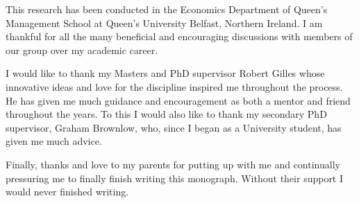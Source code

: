 \documentclass[11pt,fleqn]{book}
\begin{document}
This research has been conducted in the Economics Department of Queen's Management School at Queen's University Belfast, Northern Ireland. I am thankful for all the many beneficial and encouraging discussions with members of our group over my academic career. 

I would like to thank my Masters and PhD supervisor Robert Gilles whose innovative ideas and love for the discipline inspired me throughout the process. He has given me much guidance and encouragement as both a mentor and friend throughout the years. To this I would also like to thank my secondary PhD supervisor, Graham Brownlow, who, since I began as a University student, has given me much advice.

Finally, thanks and love to my parents for putting up with me and continually pressuring me to finally finish writing this monograph. Without their support I would never finished writing.

\newpage
\mbox{}
\thispagestyle{empty}
\newpage

\setcounter{page}{1} 
\end{document}

